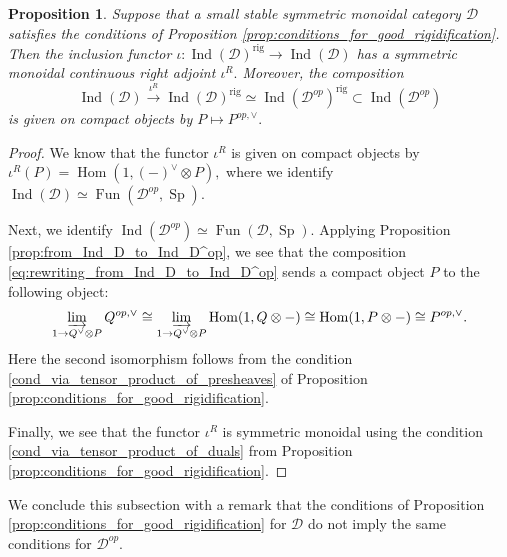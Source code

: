 \documentclass[11pt,leqno]{amsart}
\newtheorem{prop}[theo]{Proposition}
\numberwithin{equation}{section}
\def\Hom{\operatorname{Hom}}
\newcommand{\indlim}[1][]{\mathop{\varinjlim}\limits_{#1}}
\newcommand{\xto}{\xrightarrow}
\newcommand{\rig}{\operatorname{rig}}
\newcommand{\cD}{{\mathcal D}}
\newcommand{\Fun}{\operatorname{Fun}}
\newcommand{\Sp}{\operatorname{Sp}}
\newcommand{\Ind}{\operatorname{Ind}}
\begin{document}
\begin{prop}\label{prop:right_adjoint_description_for_rigidification}
Suppose that a small stable symmetric monoidal category $\cD$ satisfies the conditions of Proposition \ref{prop:conditions_for_good_rigidification}. Then the inclusion functor $\iota:\Ind(\cD)^{\rig}\to\Ind(\cD)$ has a symmetric monoidal continuous right adjoint $\iota^R.$ Moreover, the composition
\begin{equation}\label{eq:rewriting_from_Ind_D_to_Ind_D^op}
\Ind(\cD)\xto{\iota^R}\Ind(\cD)^{\rig}\simeq \Ind(\cD^{op})^{\rig}\subset \Ind(\cD^{op})
\end{equation}
is given on compact objects by $P\mapsto P^{op,\vee}.$
\end{prop}

\begin{proof}
We know that the functor $\iota^R$ is given on compact objects by $\iota^R(P)=\Hom(1,(-)^{\vee}\otimes P),$ where we identify $\Ind(\cD)\simeq\Fun(\cD^{op},\Sp).$

Next, we identify $\Ind(\cD^{op})\simeq \Fun(\cD,\Sp).$ Applying Proposition \ref{prop:from_Ind_D_to_Ind_D^op}, we see that the composition \eqref{eq:rewriting_from_Ind_D_to_Ind_D^op} sends a compact object $P$ to the following object:
\begin{equation*}
\indlim[1\to Q^{\vee}\otimes P] Q^{op,\vee}\cong \indlim[1\to Q^{\vee}\otimes P] \Hom(1,Q\otimes -)\cong \Hom(1,P\otimes -)\cong P^{op,\vee}. 
\end{equation*}
Here the second isomorphism follows from the condition \ref{cond_via_tensor_product_of_presheaves} of Proposition \ref{prop:conditions_for_good_rigidification}.

Finally, we see that the functor $\iota^R$ is symmetric monoidal using the condition \ref{cond_via_tensor_product_of_duals} from Proposition \ref{prop:conditions_for_good_rigidification}.
\end{proof}

We conclude this subsection with a remark that the conditions of Proposition \ref{prop:conditions_for_good_rigidification} for $\cD$ do not imply the same conditions for $\cD^{op}.$
\end{document}
